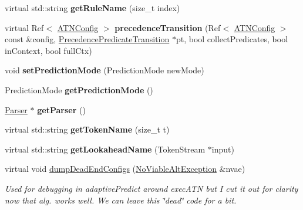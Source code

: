 \begin{DoxyCompactItemize}
\mbox{\label{classantlr4_1_1atn_1_1ParserATNSimulator_a183b00733905fd53dc42e8e2655c5853}} 
virtual std\+::string {\bfseries get\+Rule\+Name} (size\+\_\+t index)
\item 
\mbox{\label{classantlr4_1_1atn_1_1ParserATNSimulator_a75c127196f9e2214fe8451d680bdb5e3}} 
virtual Ref$<$ \hyperlink{classantlr4_1_1atn_1_1ATNConfig}{A\+T\+N\+Config} $>$ {\bfseries precedence\+Transition} (Ref$<$ \hyperlink{classantlr4_1_1atn_1_1ATNConfig}{A\+T\+N\+Config} $>$ const \&config, \hyperlink{classantlr4_1_1atn_1_1PrecedencePredicateTransition}{Precedence\+Predicate\+Transition} $\ast$pt, bool collect\+Predicates, bool in\+Context, bool full\+Ctx)
\item 
\mbox{\label{classantlr4_1_1atn_1_1ParserATNSimulator_a0b5fc9f6a099bdc9931f9afc50f35232}} 
void {\bfseries set\+Prediction\+Mode} (Prediction\+Mode new\+Mode)
\item 
\mbox{\label{classantlr4_1_1atn_1_1ParserATNSimulator_a6b226f17f38266404b543d286717b28d}} 
Prediction\+Mode {\bfseries get\+Prediction\+Mode} ()
\item 
\mbox{\label{classantlr4_1_1atn_1_1ParserATNSimulator_ac76320b0c4de94dc4e4615346c659f0b}} 
\hyperlink{classantlr4_1_1Parser}{Parser} $\ast$ {\bfseries get\+Parser} ()
\item 
\mbox{\label{classantlr4_1_1atn_1_1ParserATNSimulator_a5f79c144aff232c37c906060e84a3d3f}} 
virtual std\+::string {\bfseries get\+Token\+Name} (size\+\_\+t t)
\item 
\mbox{\label{classantlr4_1_1atn_1_1ParserATNSimulator_a51b55922ce19b4812b517f717233495a}} 
virtual std\+::string {\bfseries get\+Lookahead\+Name} (Token\+Stream $\ast$input)
\item 
virtual void \hyperlink{classantlr4_1_1atn_1_1ParserATNSimulator_a17be01f2a7db2f2c18c973cc2799a5a0}{dump\+Dead\+End\+Configs} (\hyperlink{classantlr4_1_1NoViableAltException}{No\+Viable\+Alt\+Exception} \&nvae)
\begin{DoxyCompactList}\small\item\em Used for debugging in adaptive\+Predict around exec\+A\+TN but I cut it out for clarity now that alg. works well. We can leave this \char`\"{}dead\char`\"{} code for a bit. \end{DoxyCompactList}\end{DoxyCompactItemize}
